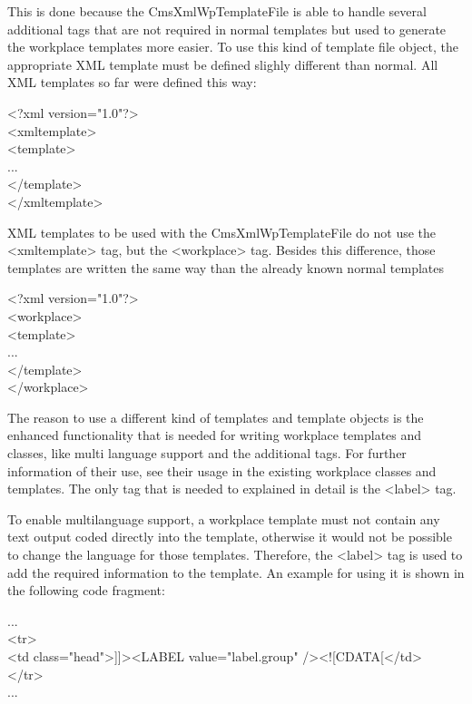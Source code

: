 This is done because the {\name CmsXmlWpTemplateFile} is able to handle several
additional tags that are not required in normal templates but used to
generate the workplace templates more easier. To use this kind of
template file object, the appropriate XML template must be defined
slighly different than normal. All XML templates so far were defined
this way:

\begin{xml}
<?xml version="1.0"?>\\
<xmltemplate>\\
\xtaba  <template>\\
\xtaba   ...\\
\xtaba  </template>\\
</xmltemplate>\\
\end{xml}

XML templates to be used with the {\name CmsXmlWpTemplateFile} do not use the
{\tag <xmltemplate>} tag, but the {\tag <workplace>} tag. Besides this difference,
those templates are written the same way than the already known normal
templates

\begin{xml}
<?xml version="1.0"?>\\
<workplace>\\
\xtaba  <template>\\
...\\
\xtaba  </template>\\
</workplace>\\
\end{xml}

The reason to use a different kind of templates and template objects is
the enhanced functionality that is needed for writing workplace
templates and classes, like multi language support and the additional
tags. For further information of their use, see their usage in the
existing workplace classes and templates. The only tag that is needed
to explained in detail is the <label> tag.

To enable multilanguage support, a workplace template must not contain
any text output coded directly into the template, otherwise it would not
be possible  to change the language for those templates. Therefore, the
{\tag <label>} tag is used to add the required information to the template. An
example for using it is shown in the following code fragment:

\begin{java}
...\\
<tr>\\
<td class="head">]]><LABEL value="label.group" /><![CDATA[</td>\\
</tr>\\
...\\
\end{java}

